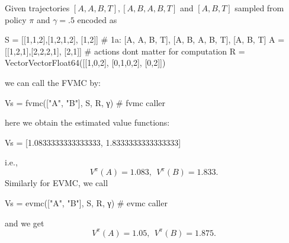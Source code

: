 \documentclass[12pt]{article}
\begin{document}
Given trajectories $[A,A,B,T], [A,B,A,B,T]$ and $[A,B,T]$ sampled from policy $\pi$ and $\gamma = .5$ encoded as
\begin{jllisting}
    S = [[1,1,2],[1,2,1,2], [1,2]] # 1a:  [A, A, B, T], [A, B, A, B, T], [A, B, T]
    A = [[1,2,1],[2,2,2,1], [2,1]] # actions dont matter for computation
    R = Vector{Vector{Float64}}([[1,0,2], [0,1,0,2], [0,2]])
\end{jllisting}
we can call the FVMC by:
\begin{jllisting}
    Vs = fvmc(["A", "B"], S, R, γ)  # fvmc caller
\end{jllisting}
here we obtain the estimated value functions:
\begin{jllisting}
    Vs = [1.0833333333333333, 1.8333333333333333]
\end{jllisting}
i.e., 
\begin{equation*}
    V^{\pi}(A) = 1.083, ~~ V^{\pi}(B) = 1.833.
\end{equation*}
Similarly for EVMC, we call
\begin{jllisting}
    Vs = evmc(["A", "B"], S, R, γ)  # evmc caller
\end{jllisting}
and we get
\begin{equation*}
    V^{\pi}(A) = 1.05, ~~ V^{\pi}(B) = 1.875.
\end{equation*}
\end{document}
